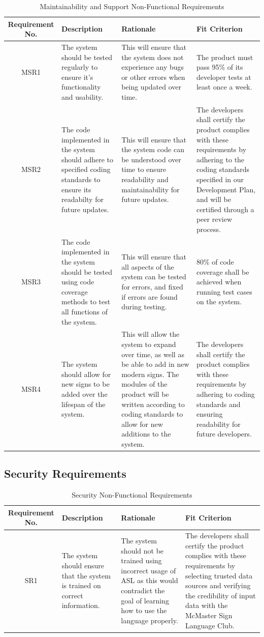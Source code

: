 \documentclass[12pt, titlepage]{article}
\begin{document}
\begin{longtable}{| c | p{3cm}| p{3cm}| p{3cm}|}
\caption{Maintainability and Support Non-Functional Requirements} \\
\hline 
\textbf{Requirement No.} & \textbf{Description} & \textbf{Rationale} & \textbf{Fit Criterion}\\
\hline
MSR1 & The system should be tested regularly to ensure it's functionality and usability. & This will ensure that the system does not experience any bugs or other errors when being updated over time. & The product must pass 95\% of its developer tests at least once a week. \\
\hline
MSR2 & The code implemented in the system should adhere to specified coding standards to ensure its readabilty for future updates. & This will ensure that the system code can be understood over time to ensure readability and maintainability for future updates. & The developers shall certify the product complies with these requirements by adhering to the coding standards specified in our Development Plan, and will be certified through a peer review process. \\
\hline
MSR3 & The code implemented in the system should be tested using code coverage methods to test all functions of the system. & This will ensure that all aspects of the system can be tested for errors, and fixed if errors are found during testing. & 80\% of code coverage shall be achieved when running test cases on the system. \\
\hline
MSR4 & The system should allow for new signs to be added over the lifespan of the system. & This will allow the system to expand over time, as well as be able to add in new modern signs. The modules of the product will be written according to coding standards to allow for new additions to the system. & The developers shall certify the product complies with these requirements by adhering to coding standards and ensuring readability for future developers. \\
\bottomrule
\end{longtable}

\subsection{Security Requirements}

\begin{table}[H]
\caption{Security Non-Functional Requirements}
\noindent \begin{tabular}{| c | p{3cm}| p{3cm}| p{3cm}|}
\hline 
\textbf{Requirement No.} & \textbf{Description} & \textbf{Rationale} & \textbf{Fit Criterion}\\
\hline
SR1 & The system should ensure that the system is trained on correct information. & The system should not be trained using incorrect usage of ASL as this would contradict the goal of learning how to use the language properly. & The developers shall certify the product complies with these requirements by selecting trusted data sources and verifying the credibility of input data with the McMaster Sign Language Club. \\
\bottomrule
\end{tabular}
\end{table}
\end{document}
